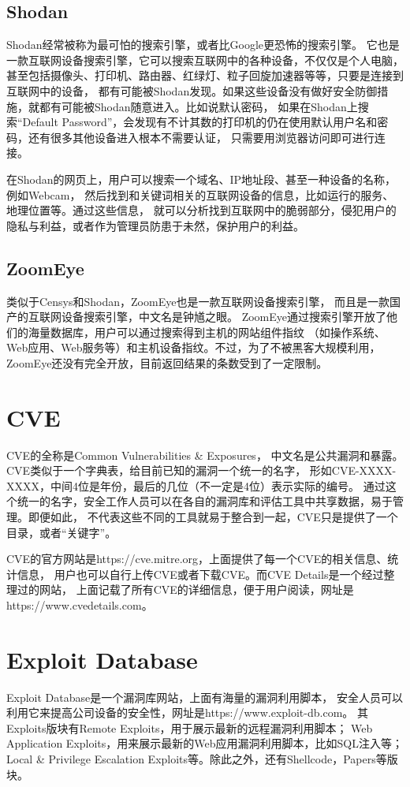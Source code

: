 \subsection{Shodan}
\label{sec:Shodan}

Shodan经常被称为最可怕的搜索引擎，或者比Google更恐怖的搜索引擎。
它也是一款互联网设备搜索引擎，它可以搜索互联网中的各种设备，不仅仅是个人电脑，
甚至包括摄像头、打印机、路由器、红绿灯、粒子回旋加速器等等，只要是连接到互联网中的设备，
都有可能被Shodan发现。如果这些设备没有做好安全防御措施，就都有可能被Shodan随意进入。比如说默认密码，
如果在Shodan上搜索“Default Password”，会发现有不计其数的打印机的仍在使用默认用户名和密码，还有很多其他设备进入根本不需要认证，
只需要用浏览器访问即可进行连接。

在Shodan的网页上，用户可以搜索一个域名、IP地址段、甚至一种设备的名称，例如Webcam，
然后找到和关键词相关的互联网设备的信息，比如运行的服务、地理位置等。通过这些信息，
就可以分析找到互联网中的脆弱部分，侵犯用户的隐私与利益，或者作为管理员防患于未然，保护用户的利益。

\subsection{ZoomEye}
\label{sec:ZoomEye}

类似于Censys和Shodan，ZoomEye也是一款互联网设备搜索引擎，
而且是一款国产的互联网设备搜索引擎，中文名是钟馗之眼。
ZoomEye通过搜索引擎开放了他们的海量数据库，用户可以通过搜索得到主机的网站组件指纹
（如操作系统、Web应用、Web服务等）和主机设备指纹。不过，为了不被黑客大规模利用，
ZoomEye还没有完全开放，目前返回结果的条数受到了一定限制。

\section{CVE}
\label{sec:CVE}

CVE的全称是Common Vulnerabilities \& Exposures，
中文名是公共漏洞和暴露。CVE类似于一个字典表，给目前已知的漏洞一个统一的名字，
形如CVE-XXXX-XXXX，中间4位是年份，最后的几位（不一定是4位）表示实际的编号。
通过这个统一的名字，安全工作人员可以在各自的漏洞库和评估工具中共享数据，易于管理。即便如此，
不代表这些不同的工具就易于整合到一起，CVE只是提供了一个目录，或者“关键字”。

CVE的官方网站是https://cve.mitre.org，上面提供了每一个CVE的相关信息、统计信息，
用户也可以自行上传CVE或者下载CVE。而CVE Details是一个经过整理过的网站，
上面记载了所有CVE的详细信息，便于用户阅读，网址是https://www.cvedetails.com。

\section{Exploit Database}
\label{sec:Exploit-Database}

Exploit Database是一个漏洞库网站，上面有海量的漏洞利用脚本，
安全人员可以利用它来提高公司设备的安全性，网址是https://www.exploit-db.com。
其Exploits版块有Remote Exploits，用于展示最新的远程漏洞利用脚本；
Web Application Exploits，用来展示最新的Web应用漏洞利用脚本，比如SQL注入等；
Local \& Privilege Escalation Exploits等。除此之外，还有Shellcode，Papers等版块。
